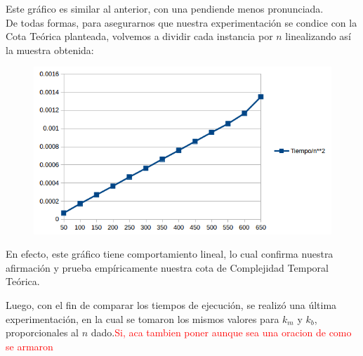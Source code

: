   
  Este gr\'afico es similar al anterior, con una pendiende menos pronunciada.\\
  
  De todas formas, para asegurarnos que nuestra experimentaci\'on se condice con la Cota Te\'orica planteada, volvemos a dividir cada instancia por $n$ linealizando as\'i la muestra obtenida:\\
  
    \begin{figure}[h!]
   \begin{center}
	\includegraphics[scale=0.8]{imagenes/ej1/peorCaso3.png}
   \end{center}
  \end{figure}
  
  En efecto, este gr\'afico tiene comportamiento lineal, lo cual confirma nuestra afirmaci\'on y prueba emp\'iricamente nuestra cota de Complejidad Temporal Te\'orica.
  
  \newpage
  
  Luego, con el fin de comparar los tiempos de ejecuci\'on, se realiz\'o una \'ultima experimentaci\'on, en la cual se tomaron los mismos valores para $k_m$ y $k_b$, proporcionales al $n$ dado.\textcolor{red}{Si, aca tambien poner aunque sea una oracion de como se armaron}\\
  
